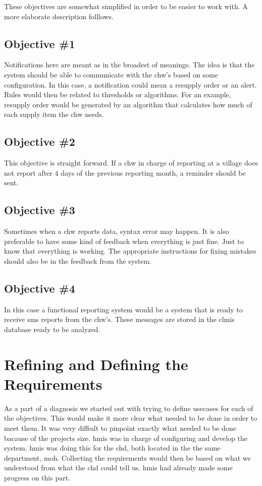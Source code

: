 These objectives are somewhat simplified in order to be easier to work with. A more elaborate description folllows. 
\subsection{Objective \#1}
Notifications here are meant as in the broadest of meanings. The idea is that the system should be able to communicate with the \gls{chw}'s based on some configuration. In this case, a notification could mean a resupply order or an alert. Rules would then be related to thresholds or algorithms. For an example, resupply order would be generated by an algorithm that calculates how much of each supply item the \gls{chw} needs. 
\subsection{Objective \#2}
This objective is straight forward. If a \gls{chw} in charge of reporting at a village does not report after 4 days of the previous reporting month, a reminder should be sent. 
\subsection{Objective \#3}
Sometimes when a \gls{chw} reports data, syntax error may happen. It is also preferable to have some kind of feedback when everything is just fine. Just to know that everything is working. 
The appropriate instructions for fixing mistakes should also be in the feedback from the system.
\subsection{Objective \#4}
In this case a functional reporting system would be a system that is ready to receive \gls{sms} reports from the \gls{chw}'s. These messages are stored in the \gls{clmis} database ready to be analyzed. 

\section{Refining and Defining the Requirements}
As a part of a diagnosis we started out with trying to define usecases for each of the objectives. 
This would make it more clear what needed to be done in order to meet them.
It was very diffiult to pinpoint exactly what needed to be done bacause of the projects size. 
\gls{hmis} was in charge of configuring and develop the system. \gls{hmis} was doing this for the \gls{chd}, both located in the the same department, \gls{moh}. 
Collecting the requirements would then be based on what we understood from what the \gls{chd} could tell us. \gls{hmis} had already made some progress on this part.  

